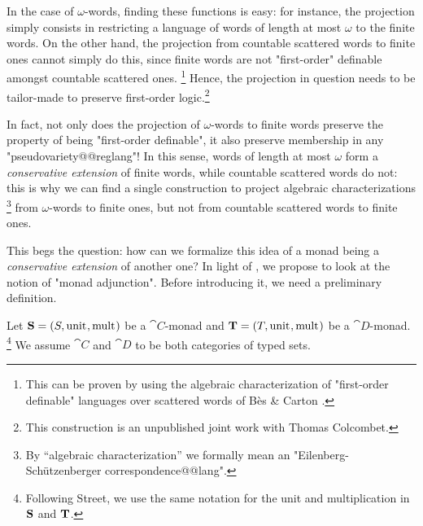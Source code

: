 In the case of $\omega$-words, finding these functions is easy: for instance, 
the projection simply consists in restricting a language of words of
length at most $\omega$ to the finite words.
On the other hand, the projection from countable scattered words
to finite ones cannot simply do this, since finite words are not
"first-order" definable amongst countable scattered ones.%
\footnote{This can be proven by using the algebraic characterization
of "first-order definable" languages over scattered words of
Bès \& Carton \cite[Theorem~21]{BesCarton2011AlgebraicFO}.}
Hence, the projection in question needs to be tailor-made to 
preserve first-order logic.\footnote{This construction is an unpublished joint
work with Thomas Colcombet.}

In fact, not only does the projection of $\omega$-words to finite words preserve
the property of being "first-order definable", it also preserve membership in any
"pseudovariety@@reglang"! In this sense, words of length at most $\omega$
form a \emph{conservative extension} of finite words, while
countable scattered words do not: this is why we can find a single construction
to project algebraic characterizations%
\footnote{By ``algebraic characterization'' we formally mean an "Eilenberg-Schützenberger correspondence@@lang".}
from $\omega$-words to finite ones, but not from countable scattered words to finite ones.

This begs the question: how can we formalize this idea of a monad being
a \emph{conservative extension} of another one?
In light of , we propose to look at the notion of "monad adjunction".
Before introducing it, we need a preliminary definition.

Let $\Monad[S] = (S,\unit,\mult)$ be a $\cat{C}$-monad
and $\Monad[T] = (T,\unit,\mult)$ be a $\cat{D}$-monad.%
\footnote{Following Street, we use the same notation for the unit and multiplication in $\Monad[S]$ and $\Monad[T]$.}
We assume $\cat C$ and $\cat D$ to be both categories of typed sets.

